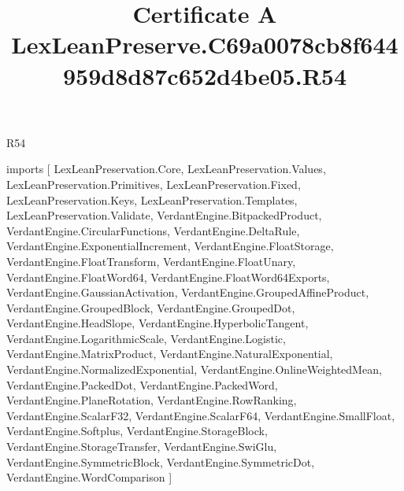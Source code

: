 \begin{lexlean}{R54}
\title{Certificate A LexLeanPreserve.C69a0078cb8f644959d8d87c652d4be05.R54}
\begin{coremodule}
imports [
  LexLeanPreservation.Core,
  LexLeanPreservation.Values,
  LexLeanPreservation.Primitives,
  LexLeanPreservation.Fixed,
  LexLeanPreservation.Keys,
  LexLeanPreservation.Templates,
  LexLeanPreservation.Validate,
  VerdantEngine.BitpackedProduct,
  VerdantEngine.CircularFunctions,
  VerdantEngine.DeltaRule,
  VerdantEngine.ExponentialIncrement,
  VerdantEngine.FloatStorage,
  VerdantEngine.FloatTransform,
  VerdantEngine.FloatUnary,
  VerdantEngine.FloatWord64,
  VerdantEngine.FloatWord64Exports,
  VerdantEngine.GaussianActivation,
  VerdantEngine.GroupedAffineProduct,
  VerdantEngine.GroupedBlock,
  VerdantEngine.GroupedDot,
  VerdantEngine.HeadSlope,
  VerdantEngine.HyperbolicTangent,
  VerdantEngine.LogarithmicScale,
  VerdantEngine.Logistic,
  VerdantEngine.MatrixProduct,
  VerdantEngine.NaturalExponential,
  VerdantEngine.NormalizedExponential,
  VerdantEngine.OnlineWeightedMean,
  VerdantEngine.PackedDot,
  VerdantEngine.PackedWord,
  VerdantEngine.PlaneRotation,
  VerdantEngine.RowRanking,
  VerdantEngine.ScalarF32,
  VerdantEngine.ScalarF64,
  VerdantEngine.SmallFloat,
  VerdantEngine.Softplus,
  VerdantEngine.StorageBlock,
  VerdantEngine.StorageTransfer,
  VerdantEngine.SwiGlu,
  VerdantEngine.SymmetricBlock,
  VerdantEngine.SymmetricDot,
  VerdantEngine.WordComparison
]


\end{coremodule}
\end{lexlean}
